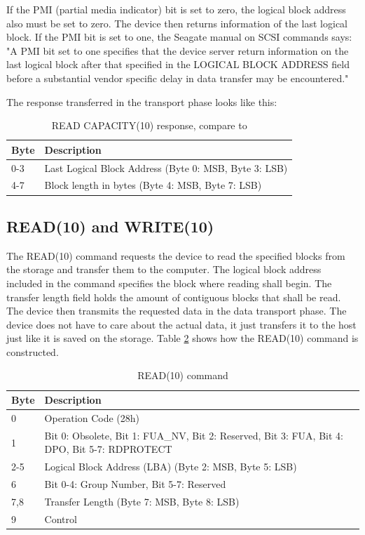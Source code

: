 If the PMI (partial media indicator) bit is set to zero, the logical block address also must be set to zero. The device then returns information of the last logical block. If the PMI bit is set to one, the Seagate manual on SCSI commands says: "A PMI bit set to one specifies that the device server return information on the last logical block after that specified in the LOGICAL BLOCK ADDRESS field before a substantial vendor specific delay in data transfer may be encountered."\cite{scsi_seagate}

The response transferred in the transport phase looks like this:

\begin{table}[ht]
\caption{READ CAPACITY(10) response, compare to \cite{usb_ms_jan, scsi_seagate}}
\centering
\begin{tabular}{|l|l|}
\hline\hline
\textbf{Byte} & \textbf{Description}\\ \hline
0-3 & Last Logical Block Address (Byte 0: MSB, Byte 3: LSB)\\ \hline
4-7 & Block length in bytes (Byte 4: MSB, Byte 7: LSB) \\ \hline
\end{tabular}
\label{table:read_capacity_response}
\end{table}

\subsection{READ(10) and WRITE(10)}

The READ(10) command requests the device to read the specified blocks from the storage and transfer them to the computer. The logical block address included in the command specifies the block where reading shall begin. The transfer length field holds the amount of contiguous blocks that shall be read. The device then transmits the requested data in the data transport phase. The device does not have to care about the actual data, it just transfers it to the host just like it is saved on the storage. Table \ref{table:read_10} shows how the READ(10) command is constructed.

\begin{table}[ht]
\caption{READ(10) command \cite{scsi_seagate}}
\centering
\begin{tabular}{|l|p{10cm}|}
\hline\hline
\textbf{Byte} & \textbf{Description}\\ \hline
0 & Operation Code (28h)\\ \hline
1 & Bit 0: Obsolete, Bit 1: FUA\_NV, Bit 2: Reserved, Bit 3: FUA, Bit 4: DPO, Bit 5-7: RDPROTECT \\ \hline
2-5 & Logical Block Address (LBA) (Byte 2: MSB, Byte 5: LSB) \\ \hline
6 & Bit 0-4: Group Number, Bit 5-7: Reserved \\ \hline
7,8 & Transfer Length (Byte 7: MSB, Byte 8: LSB) \\ \hline
9 & Control \\ \hline
\end{tabular}
\label{table:read_10}
\end{table}

